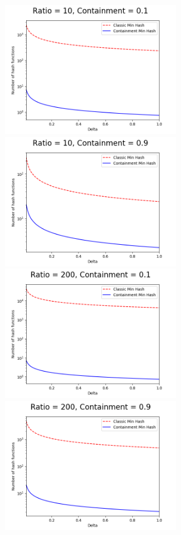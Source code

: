 \documentclass[11pt]{amsart}
\theoremstyle{remark}
\numberwithin{equation}{section}
\begin{document}
\begin{enumerate}
\begin{figure}[!h]%
\begin{center}
\includegraphics[width=3.0in,trim={0 0 0 0in},clip]{Figs/1010.png}%
\hspace{1ex}
\includegraphics[width=3.0in,trim={0 0 0 0in},clip]{Figs/1090.png}\\
\includegraphics[width=3.0in,trim={0 0 0 0in},clip]{Figs/20010.png}%
\hspace{1ex}
\includegraphics[width=3.0in,trim={0 0 0 0in},clip]{Figs/20090.png}

\end{center}
\end{figure}
\end{enumerate}
\end{document}
